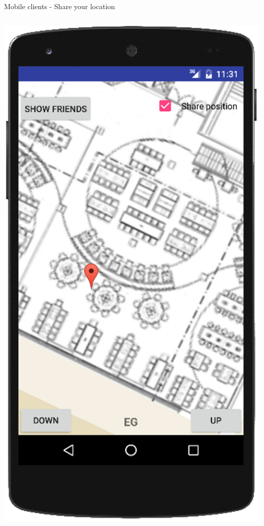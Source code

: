 \documentclass[11pt]{beamer}
\begin{document}
\begin{frame}{Mobile clients - Share your location}
\begin{columns}[T]
	\begin{column}{.4\textwidth}
	\includegraphics[scale=0.27]{android_pinpoint}
	\end{column}
\end{columns}

\end{frame}
\end{document}
